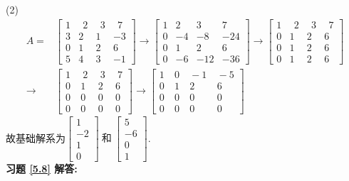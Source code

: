 \documentclass[a4paper]{book}
\begin{document}
(2)
\begin{displaymath}
\begin{aligned}
A=&\begin{bmatrix} 1&\ \ 2&\ \ 3&\ \ 7\\3&2&1&-3\\0&1&2&6\\5&4&3&-1   \end{bmatrix}\rightarrow
\begin{bmatrix}1&2&3&7\\0&-4&-8&-24\\0&1&2&6\\0&-6&-12&-36    \end{bmatrix}\rightarrow
\begin{bmatrix}1&\ \ 2&\ \ 3&\ \ 7\\0&1&2&6\\0&1&2&6\\0&1&2&6    \end{bmatrix}\\ \rightarrow &
\begin{bmatrix}1&\ \ 2&\ \ 3&\ \ 7\\0&\ 1&\ 2&\ 6\\0&\ 0&\ 0&\ 0\\0&\ 0&\ 0&\ 0    \end{bmatrix}\rightarrow
\begin{bmatrix}1&\ 0&\ -1&\ -5\\0&\ 1&\ 2&\ 6\\0&\ 0& \ 0&\ 0\\0&\ 0& \ 0&\ 0    \end{bmatrix}\end{aligned} \end{displaymath}
故基础解系为$\begin{bmatrix}1\\-2\\1\\0\end{bmatrix}\ \mbox{和}\ \begin{bmatrix}5\\-6\\0\\1\end{bmatrix}$.\\
\textbf{习题 \ref{5.8} 解答:}\\
\end{document}

